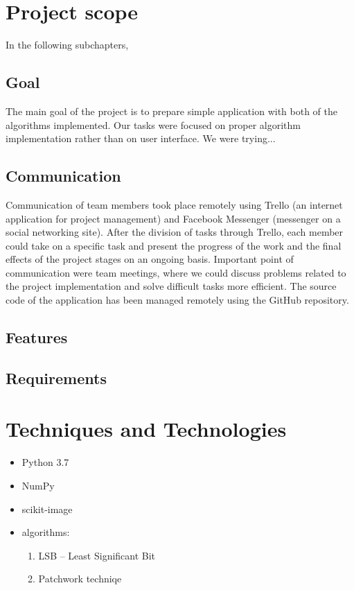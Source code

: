 \documentclass{article}
\begin{document}
\section{Project scope}

In the following subchapters, 

	\subsection{Goal}
	The main goal of the project is to prepare simple application with both of the algorithms implemented. Our tasks were focused on proper algorithm implementation rather than on user interface. We were trying...
	
	\subsection{Communication}
	Communication of team members took place remotely using Trello (an internet
	application for project management) and Facebook Messenger (messenger on a social
	networking site). After the division of tasks through Trello, each member could take on	a specific task and present the progress of the work and the final effects of the project stages on an ongoing basis. Important point of communication were team meetings, where we could discuss problems related to the project implementation and solve difficult tasks more efficient. The source code of the application has been managed remotely using the GitHub repository.
	
	\subsection{Features}

	
	\subsection{Requirements}
\section{Techniques and Technologies}
	
	\begin{itemize}
		\item Python 3.7
		\item NumPy
		\item scikit-image
		\item algorithms: \begin{enumerate}
			\item LSB – Least Significant Bit
			\item Patchwork techniqe
		\end{enumerate}
	\end{itemize}
	
\end{document}
